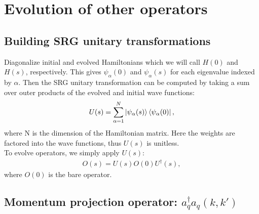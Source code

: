 \documentclass[preprintnumbers,floatfix,aps,prc,preprint,nofootinbib]{revtex4-1}
\begin{document}
\section{Evolution of other operators}
\label{sec:evolution_other_operators}


\subsection{Building SRG unitary transformations}
\label{sec:srg_unitary_transformations}


Diagonalize initial and evolved Hamiltonians which we will call $H(0)$ and $H(s)$, respectively. This gives $\psi_{\alpha}(0)$ and $\psi_{\alpha}(s)$ for each eigenvalue indexed by $\alpha$. Then the SRG unitary transformation can be computed by taking a sum over outer products of the evolved and initial wave functions:
%
\begin{eqnarray}
	\label{eq:unitary_transformation}
	U(s) = \sum_{\alpha=1}^{N} \ket{\psi_{\alpha}(s)} \bra{\psi_{\alpha}(0)},
\end{eqnarray}
%
where N is the dimension of the Hamiltonian matrix. Here the weights are factored into the wave functions, thus $U(s)$ is unitless.
\\

To evolve operators, we simply apply $U(s)$:
%
\begin{eqnarray}
	\label{eq:evolved_operator}
	O(s) = U(s) O(0) U^{\dagger}(s),
\end{eqnarray}
%
where $O(0)$ is the bare operator.


\subsection{Momentum projection operator: $a^{\dagger}_q a_q (k, k')$}
\label{sec:momentum_proj_operator}
\end{document}
